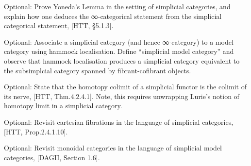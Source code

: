 \documentclass[a4paper]{amsart}
\numberwithin{figure}{section}
\theoremstyle{theorem}
\theoremstyle{definition}
\begin{document}
Optional: Prove Yoneda's Lemma in the setting of simplicial categories, and explain how one deduces the ∞-categorical statement from the simplicial categorical statement, [HTT, §5.1.3].

Optional: Associate a simplicial category (and hence ∞-category) to a model category using hammock localisation. Define ``simplicial model category'' and observe that hammock localisation produces a simplicial category equivalent to the subsimplcial category spanned by fibrant-cofibrant objects.

Optional: State that the homotopy colimit of a simplicial functor is the colimit of its nerve, [HTT, Thm.4.2.4.1]. %
Note, this requires unwrapping Lurie's notion of homotopy limit in a simplicial category. 

Optional: Revisit cartesian fibrations in the language of simplicial categories, [HTT, Prop.2.4.1.10]. 

Optional: Revisit monoidal categories in the language of simplicial model categories, [DAGII, Section 1.6]. %
%
%
%
%
%
%
%
\end{document}

